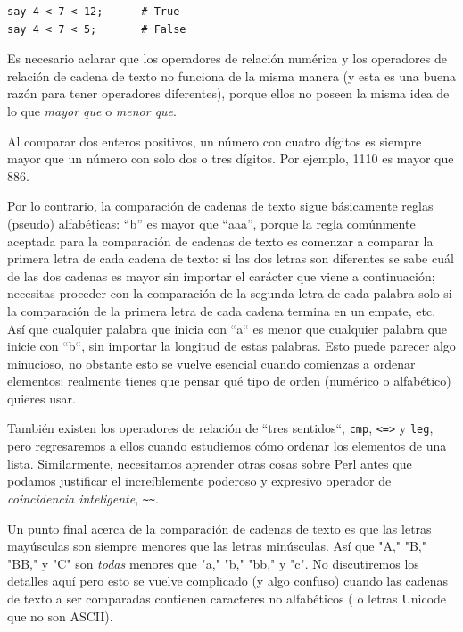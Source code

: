\begin{verbatim}
say 4 < 7 < 12;      # True
say 4 < 7 < 5;       # False
\end{verbatim}

Es necesario aclarar que los operadores de relación
numérica y los operadores de relación de cadena de texto no 
funciona de la misma manera (y esta es una buena razón 
para tener operadores diferentes), porque ellos no poseen
la misma idea de lo que \emph{mayor que} o \emph{menor que}.

Al comparar dos enteros positivos, un número con cuatro dígitos
es siempre mayor que un número con solo dos o tres dígitos. 
Por ejemplo, 1110 es mayor que 886. 

Por lo contrario, la comparación de cadenas de texto
sigue básicamente reglas (pseudo) alfabéticas: 
``b'' es mayor que ``aaa'', porque la regla comúnmente
aceptada para la comparación de cadenas de texto es
comenzar a comparar la primera letra de cada cadena
de texto: si las dos letras son diferentes se sabe cuál de
las dos cadenas es mayor sin importar el carácter que viene
a continuación; necesitas proceder con la comparación
de la segunda letra de cada palabra solo si la comparación
de la primera letra de cada cadena termina en un empate, etc.
Así que cualquier palabra que inicia con ``a`` es menor que 
cualquier palabra que inicie con ``b``, sin importar la longitud
de estas palabras. Esto puede parecer algo minucioso, no 
obstante esto se vuelve esencial cuando comienzas 
a ordenar elementos: realmente tienes que pensar qué tipo
de orden (numérico o alfabético) quieres usar.

También existen los operadores de relación de ``tres sentidos``,
{\tt cmp}, {\tt <=>} y {\tt leg}, pero regresaremos a ellos
cuando estudiemos cómo ordenar los elementos de una lista. 
Similarmente, necesitamos aprender otras cosas sobre Perl antes
que podamos justificar el increíblemente poderoso y expresivo
operador de \emph{coincidencia inteligente}, \verb|~~|.
\ifplastex \else
{}
\fi

Un punto final acerca de la comparación de cadenas
de texto es que las letras mayúsculas son siempre menores
que las letras minúsculas. Así que  "A," "B," "BB," y "C"
son \emph{todas} menores que "a," "b," "bb," y "c".
No discutiremos los detalles aquí pero esto se vuelve
complicado (y algo confuso) cuando las cadenas de texto
a ser comparadas contienen caracteres no alfabéticos (
o letras Unicode que no son ASCII).

